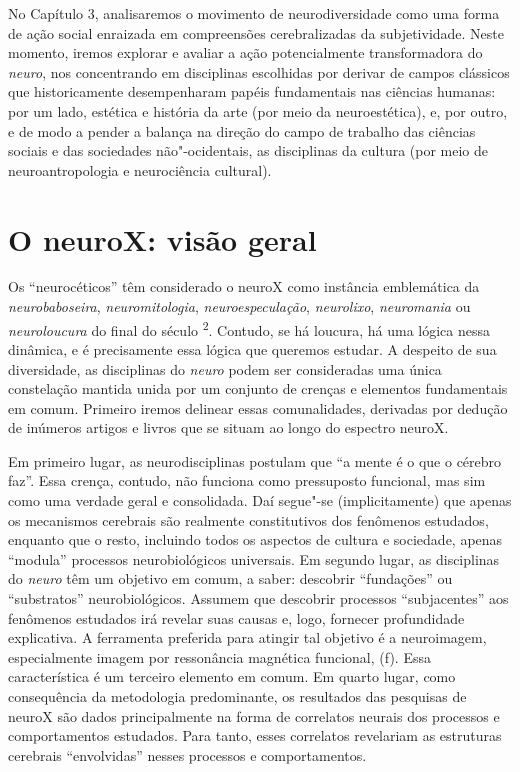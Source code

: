 No Capítulo 3, analisaremos o movimento de neurodiversidade como uma
forma de ação social enraizada em compreensões cerebralizadas da
subjetividade. Neste momento, iremos explorar e avaliar a ação
potencialmente transformadora do \emph{neuro}, nos concentrando em
disciplinas escolhidas por derivar de campos clássicos que
historicamente desempenharam papéis fundamentais nas ciências humanas:
por um lado, estética e história da arte (por meio da neuroestética), e,
por outro, e de modo a pender a balança na direção do campo de trabalho
das ciências sociais e das sociedades não"-ocidentais, as disciplinas da
cultura (por meio de neuroantropologia e neurociência cultural).

\chapter{O neuroX: visão geral}

Os ``neurocéticos'' têm considerado o neuroX como instância emblemática
da \emph{neurobaboseira}, \emph{neuromitologia},
\emph{neuroespeculação}, \emph{neurolixo}, \emph{neuromania} ou
\emph{neuroloucura} do final do século \textsuperscript{2}. Contudo,
se há loucura, há uma lógica nessa dinâmica, e é precisamente essa
lógica que queremos estudar. A despeito de sua diversidade, as
disciplinas do \emph{neuro} podem ser consideradas uma única constelação
mantida unida por um conjunto de crenças e elementos fundamentais em
comum. Primeiro iremos delinear essas comunalidades, derivadas por
dedução de inúmeros artigos e livros que se situam ao longo do espectro
neuroX.

Em primeiro lugar, as neurodisciplinas postulam que ``a mente é o que o
cérebro faz''. Essa crença, contudo, não funciona como pressuposto
funcional, mas sim como uma verdade geral e consolidada. Daí segue"-se
(implicitamente) que apenas os mecanismos cerebrais são realmente
constitutivos dos fenômenos estudados, enquanto que o resto, incluindo
todos os aspectos de cultura e sociedade, apenas ``modula'' processos
neurobiológicos universais. Em segundo lugar, as disciplinas do
\emph{neuro} têm um objetivo em comum, a saber: descobrir ``fundações''
ou ``substratos'' neurobiológicos. Assumem que descobrir processos
``subjacentes'' aos fenômenos estudados irá revelar suas causas e, logo,
fornecer profundidade explicativa. A ferramenta preferida para atingir
tal objetivo é a neuroimagem, especialmente imagem por ressonância
magnética funcional, (f). Essa característica é um terceiro elemento
em comum. Em quarto lugar, como consequência da metodologia
predominante, os resultados das pesquisas de neuroX são dados
principalmente na forma de correlatos neurais dos processos e
comportamentos estudados. Para tanto, esses correlatos revelariam as
estruturas cerebrais ``envolvidas'' nesses processos e comportamentos.

